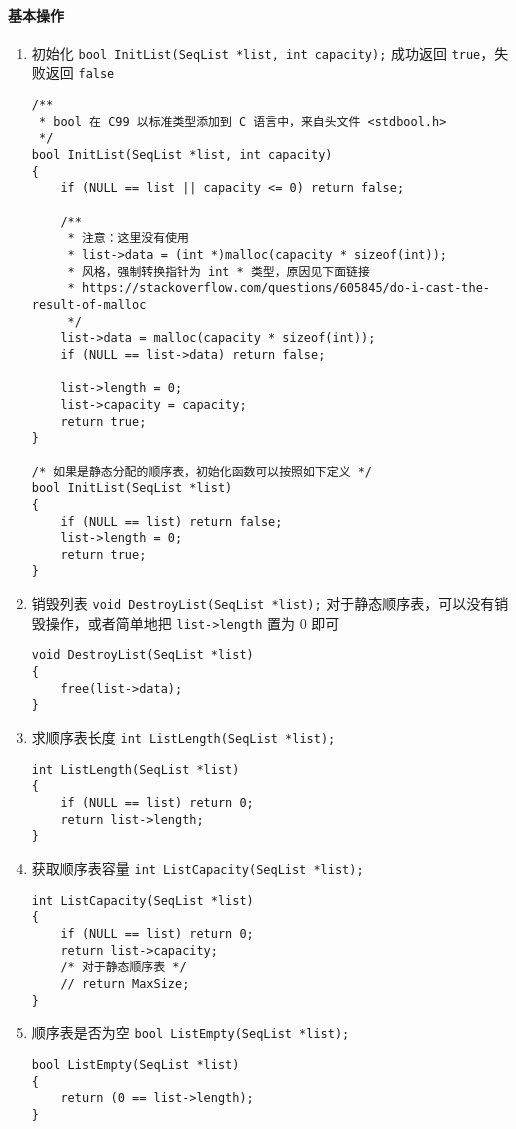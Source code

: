 \documentclass{ctexart}
\begin{document}
\paragraph{基本操作}
\begin{enumerate}
\item 初始化 \texttt{bool InitList(SeqList *list, int capacity);} 成功返回 \texttt{true}，失败返回 \texttt{false}
\begin{verbatim}
/**
 * bool 在 C99 以标准类型添加到 C 语言中，来自头文件 <stdbool.h>
 */
bool InitList(SeqList *list, int capacity)
{
    if (NULL == list || capacity <= 0) return false;

    /**
     * 注意：这里没有使用
     * list->data = (int *)malloc(capacity * sizeof(int));
     * 风格，强制转换指针为 int * 类型，原因见下面链接
     * https://stackoverflow.com/questions/605845/do-i-cast-the-result-of-malloc
     */
    list->data = malloc(capacity * sizeof(int));
    if (NULL == list->data) return false;

    list->length = 0;
    list->capacity = capacity;
    return true;
}

/* 如果是静态分配的顺序表，初始化函数可以按照如下定义 */
bool InitList(SeqList *list)
{
    if (NULL == list) return false;
    list->length = 0;
    return true;
}
\end{verbatim}

\item 销毁列表 \texttt{void DestroyList(SeqList *list);} 对于静态顺序表，可以没有销毁操作，或者简单地把 \texttt{list->length} 置为 0 即可
\begin{verbatim}
void DestroyList(SeqList *list)
{
    free(list->data);
}
\end{verbatim}

\item 求顺序表长度 \texttt{int ListLength(SeqList *list);}
\begin{verbatim}
int ListLength(SeqList *list)
{
    if (NULL == list) return 0;
    return list->length;
}
\end{verbatim}

\item 获取顺序表容量 \texttt{int ListCapacity(SeqList *list);}
\begin{verbatim}
int ListCapacity(SeqList *list)
{
    if (NULL == list) return 0;
    return list->capacity;
    /* 对于静态顺序表 */
    // return MaxSize;
}
\end{verbatim}

\item 顺序表是否为空 \texttt{bool ListEmpty(SeqList *list);}
\begin{verbatim}
bool ListEmpty(SeqList *list)
{
    return (0 == list->length);
}
\end{verbatim}


\end{enumerate}
\end{document}

